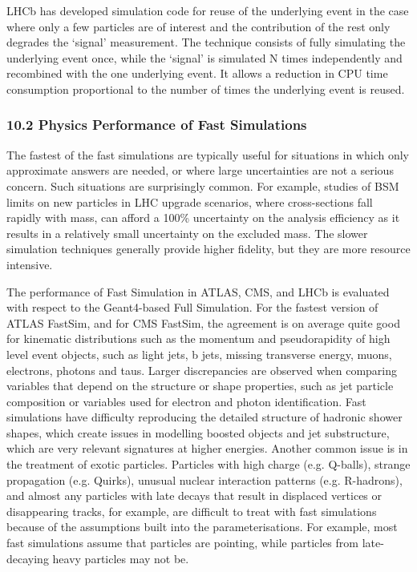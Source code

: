 \documentclass[12pt,a4paper]{article}
\begin{document}
LHCb has developed simulation code for reuse of the underlying event in
the case where only a few particles are of interest and the contribution
of the rest only degrades the `signal' measurement. The technique
consists of fully simulating the underlying event once, while the
`signal' is simulated N times independently and recombined with the one
underlying event. It allows a reduction in CPU time consumption
proportional to the number of times the underlying event is reused.

\hypertarget{physics-performance-of-fast-simulations}{%
\subsubsection{10.2 Physics Performance of Fast
Simulations}\label{physics-performance-of-fast-simulations}}

The fastest of the fast simulations are typically useful for situations
in which only approximate answers are needed, or where large
uncertainties are not a serious concern. Such situations are
surprisingly common. For example, studies of BSM limits on new particles
in LHC upgrade scenarios, where cross-sections fall rapidly with mass,
can afford a 100\% uncertainty on the analysis efficiency as it results
in a relatively small uncertainty on the excluded mass. The slower
simulation techniques generally provide higher fidelity, but they are
more resource intensive.

The performance of Fast Simulation in ATLAS, CMS, and LHCb is evaluated
with respect to the Geant4-based Full Simulation. For the fastest
version of ATLAS FastSim, and for CMS FastSim, the agreement is on
average quite good for kinematic distributions such as the momentum and
pseudorapidity of high level event objects, such as light jets, b jets,
missing transverse energy, muons, electrons, photons and taus. Larger
discrepancies are observed when comparing variables that depend on the
structure or shape properties, such as jet particle composition or
variables used for electron and photon identification. Fast simulations
have difficulty reproducing the detailed structure of hadronic shower
shapes, which create issues in modelling boosted objects and jet
substructure, which are very relevant signatures at higher energies.
Another common issue is in the treatment of exotic particles. Particles
with high charge (e.g. Q-balls), strange propagation (e.g. Quirks),
unusual nuclear interaction patterns (e.g. R-hadrons), and almost any
particles with late decays that result in displaced vertices or
disappearing tracks, for example, are difficult to treat with fast
simulations because of the assumptions built into the parameterisations.
For example, most fast simulations assume that particles are pointing,
while particles from late-decaying heavy particles may not be.
\end{document}
